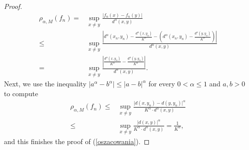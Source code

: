 \documentclass[11pt, reqno]{amsart}
\newcommand\boldred[1]{\textcolor{red}{\textbf{#1}}} %
\begin{document}
\begin{proof}
    \begin{align*}
        \rho_{\alpha, M}(f_n)={}    &   \sup_{x\neq y} \frac{\vert f_n(x)-f_n(y)\vert}{d^\alpha(x,y)}\\
        \leq &  \sup_{x\neq y}\frac{\left|d^{\alpha}(x_n,y_n)-\frac{d^\alpha(x,y_n)}{K^\alpha} -\left(d^{\alpha}(x_n,y_n)-\frac{d^\alpha(y,y_n)}{K^\alpha}\right)  \right|}{d^\alpha(x,y)}\\
        = & \sup_{x\neq y} \frac{\left|\frac{d^\alpha(x,y_n)}{K^\alpha} -\frac{d^\alpha(y,y_n)}{K^\alpha}  \right|}{d^\alpha(x,y)}.
    \end{align*}
    Next, we use  the inequality $\vert a^\alpha-b^\alpha\vert\leq \vert a-b\vert^\alpha$ for every $0<\alpha\leq 1$ and $a,b>0$ to compute
    \begin{align*}
        \rho_{\alpha, M}(f_n)\leq{}    &   \sup_{x\neq y}\frac{\vert d(x,y_n)-d(y,y_n)\vert^\alpha}{K^\alpha \cdot d^\alpha(x,y)}\\
    \leq{}  &   \sup_{x\neq y} \frac{\vert d(x,y)\vert^\alpha}{K^\alpha \cdot d^\alpha(x,y)}=\frac{1}{K^\alpha},
    \end{align*}
    and this finishes the proof of (\ref{oszacowania}).


    


\end{proof}
\end{document}
